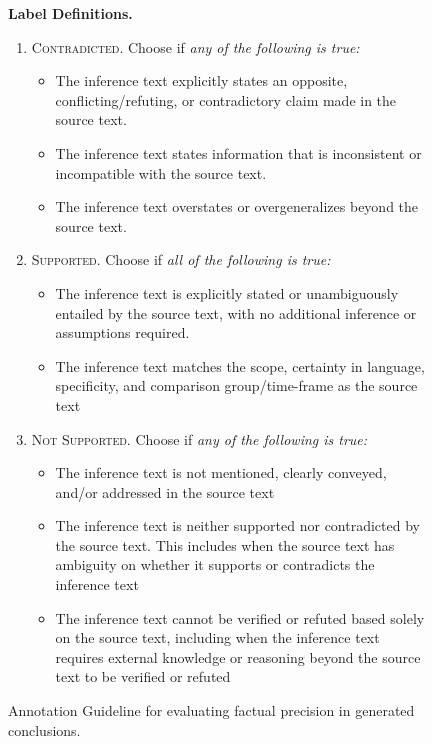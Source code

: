 \documentclass{article}
\begin{document}
\begin{figure}[t]
\begin{small}
\begin{tcolorbox}[colback=gray!5, colframe=black, width=\textwidth, title=\textbf{Annotation Guideline for Evaluating Factual Precision}, fonttitle=\bfseries]
\textbf{Label Definitions.}
\begin{enumerate}[leftmargin=0.6cm]
    \item \textsc{Contradicted.} Choose if \textit{any of the following is true:}
    \vspace{-0.2em}
    \begin{itemize}[leftmargin=0.5cm]
    \item The inference text explicitly states an opposite, conflicting/refuting, or contradictory claim made in the source text.
    \item The inference text states information that is inconsistent or incompatible with the source text.
    \item The inference text overstates or overgeneralizes beyond the source text.
    \end{itemize}

    \item \textsc{Supported.} Choose if \textit{all of the following is true:}
    \vspace{-0.2em}
    \begin{itemize}[leftmargin=0.5cm]
    \item The inference text is explicitly stated or unambiguously entailed by the source text, with no additional inference or assumptions required.
    \item The inference text matches the scope, certainty in language, specificity, and comparison group/time-frame as the source text
    \end{itemize}

    \item \textsc{Not Supported.} Choose if \textit{any of the following is true:}
    \vspace{-0.2em}
    \begin{itemize}[leftmargin=0.5cm]
    \item The inference text is not mentioned, clearly conveyed, and/or addressed in the source text
    \item The inference text is neither supported nor contradicted by the source text. This includes when the source text has ambiguity on whether it supports or contradicts the inference text
    \item The inference text cannot be verified or refuted based solely on the source text, including when the inference text requires external knowledge or reasoning beyond the source text to be verified or refuted
    \end{itemize}

\end{enumerate}
\end{tcolorbox}
\caption{Annotation Guideline for evaluating factual precision in generated conclusions.}
\label{fig:annotation_guidelines-fact-precision}
\end{small}
\end{figure}
\end{document}
